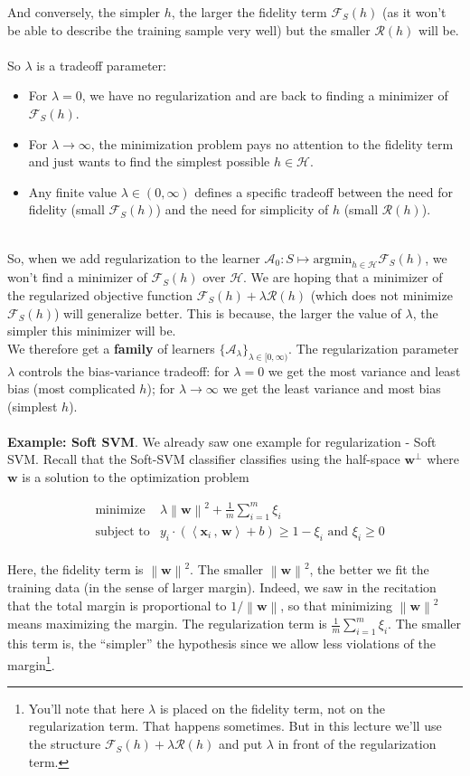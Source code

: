 \documentclass[11pt]{article}
\newcommand{\norm}[1]{\left\| #1\right\|}
\newcommand{\Ac}{\mathcal{A}}
\newcommand{\Rc}{\mathcal{R}}
\newcommand{\Fc}{\mathcal{F}}
\newcommand{\Hc}{\mathcal{H}}
\newcommand{\innerr}[2]{{\left\langle #1\,,\,#2 \right\rangle}}
\newcommand{\VV}[1]{\mathbf{#1}}
\begin{document}
And conversely, the simpler $h$, the larger the fidelity term $\Fc_S(h)$ (as it
won't be able to describe the training sample very well) but the smaller
$\Rc(h)$ will be.
\\~\\
So $\lambda$ is a tradeoff parameter:
\begin{itemize}
  \item For $\lambda=0$, we have no regularization and are back to finding a
    minimizer of $\Fc_S(h)$.
  \item For $\lambda \to\infty$, the minimization problem pays no attention to
    the fidelity term and just wants to find the simplest possible $h\in\Hc$.
  \item Any finite value $\lambda\in(0,\infty)$ defines a specific tradeoff
    between the need for fidelity (small $\Fc_S(h)$) and the need for simplicity
    of $h$ (small $\Rc(h)$).
\end{itemize}
~\\
So, when we add regularization to the learner
$\Ac_0:S\mapsto\text{argmin}_{h\in\Hc} \Fc_S(h)$, we won't find a minimizer of
$\Fc_S(h)$ over $\Hc$. We are hoping that a minimizer of the regularized
objective function $\Fc_S(h)+ \lambda \Rc(h) $ (which does not minimize
$\Fc_S(h)$) will generalize better.
This is because, the larger the value of $\lambda$, the simpler this minimizer
will be.
~\\
We therefore get a {\bf family} of learners $\{\Ac_\lambda\}_{\lambda\in[0,\infty)}$. The
regularization parameter $\lambda$ controls the bias-variance tradeoff: for
$\lambda=0$ we get the most variance and least bias (most complicated $h$); for $\lambda\to\infty$ we
get the least variance and most bias (simplest $h$).
\\~\\
{\bf Example: Soft SVM}. We already saw one example for regularization - Soft
SVM. Recall that the Soft-SVM classifier classifies using the half-space $\VV{w}^\perp$
where $\VV{w}$ is a solution to the optimization problem

\begin{eqnarray*}
      & \text{minimize}   &  \lambda \norm {\VV{w}}^2 + \frac{1}{m}\sum_{i=1}^m
      \xi_i \\
      & \text{subject to} & y_i \cdot \left( \innerr{\VV{x}_i}{\VV{w}}
     +b \right) \geq 1-\xi_i  \,\,\text{and}\,\, \xi_i\geq 0 
    \end{eqnarray*}
~\\
    Here, the fidelity term is $\norm{\VV{w}}^2$. The smaller $\norm{\VV{w}}^2$,
    the better we fit the training data (in the sense of larger margin). 
    Indeed, we saw in the recitation that
    the total margin is proportional to $1/\norm{\VV{w}}$, so that minimizing  $\norm{\VV{w}}^2$
    means maximizing the margin. 
    The regularization term is  $\frac{1}{m}\sum_{i=1}^m \xi_i$. The smaller
    this term is, the ``simpler'' the hypothesis since we allow less violations
    of the margin\footnote{You'll note that here $\lambda$ is placed on the fidelity
    term, not on the regularization term. That happens sometimes. But in this
    lecture we'll use the structure $\Fc_S(h)+ \lambda \Rc(h) $ and put
  $\lambda$ in front of the regularization term.}.
\end{document}
